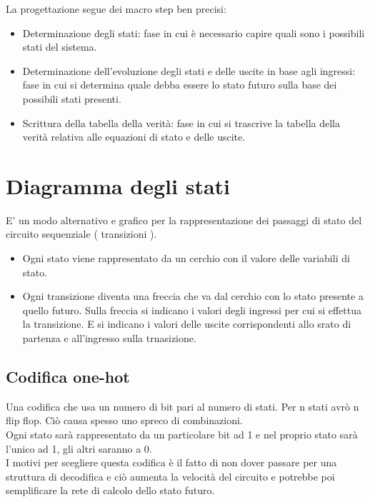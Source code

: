 \documentclass[a4paper]{book}
\begin{document}
La progettazione segue dei macro step ben precisi:

\begin{itemize}
\item{Determinazione degli stati}: fase in cui è necessario capire quali sono i possibili stati del sistema.
\item{Determinazione dell'evoluzione degli stati e delle uscite in base agli ingressi}: fase in cui si determina quale debba essere lo stato futuro sulla base dei possibili stati presenti.
\item{Scrittura della tabella della verità}: fase in cui si trascrive la tabella della verità relativa alle equazioni di stato e delle uscite.
\end{itemize}






\section{Diagramma degli stati}

E' un modo alternativo e grafico per la rappresentazione dei passaggi di stato del circuito sequenziale ( transizioni ).

\begin{itemize}
\item{}Ogni stato viene rappresentato da un cerchio con il valore delle variabili di stato.\\
\item{}Ogni transizione diventa una freccia che va dal cerchio con lo stato presente a quello futuro.
Sulla freccia si indicano i valori degli ingressi per cui si effettua la transizione.
E si indicano i valori delle uscite corrispondenti allo srato di partenza e all'ingresso sulla trnasizione.
\end{itemize}


\subsection*{Codifica one-hot}

Una codifica che usa un numero di bit pari al numero di stati.
Per n stati avrò n flip flop.
Ciò causa spesso uno spreco di combinazioni.\\
Ogni stato sarà rappresentato da un particolare bit ad 1 e nel proprio stato sarà l'unico ad 1, gli altri saranno a 0.\\
I motivi per scegliere questa codifica è il fatto di non dover passare per una struttura di decodifica e ciò aumenta la velocità del circuito e potrebbe poi semplificare la rete di calcolo dello stato futuro.
\end{document}

